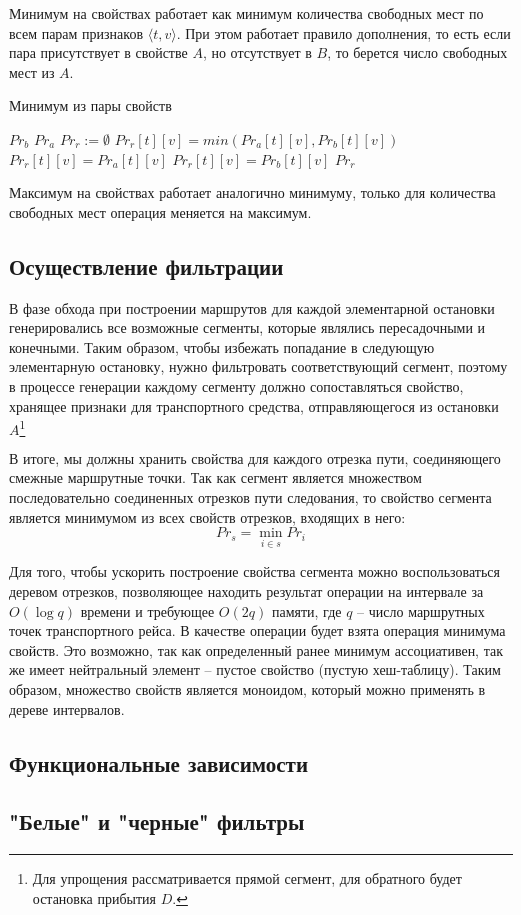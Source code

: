 Минимум на свойствах работает как минимум количества свободных мест по всем парам признаков $\langle t, v \rangle$. При этом работает правило дополнения, то есть если пара присутствует в свойстве $A$, но отсутствует в $B$, то берется число свободных мест из $A$.

\begin{algorithm}[!h]
	\caption{Минимум из пары свойств}\label{lst5}
	\begin{algorithmic}
			\State \Return $Pr_b$
		\EndIf
		\State \Return $Pr_a$
		\EndIf
		\State $Pr_r := \emptyset$ 
			\State $Pr_r[t][v] = min(Pr_a[t][v], Pr_b[t][v])$
		\EndFor
			\State $Pr_r[t][v] = Pr_a[t][v]$
		\EndFor
			\State $Pr_r[t][v] = Pr_b[t][v]$
		\EndFor
		\State \Return $Pr_r$
		\EndFunction
	\end{algorithmic}
\end{algorithm}

Максимум на свойствах работает аналогично минимуму, только для количества свободных мест операция меняется на максимум.

\subsection{Осуществление фильтрации}
В фазе обхода при построении маршрутов для каждой элементарной остановки генерировались все возможные сегменты, которые являлись пересадочными и конечными. Таким образом, чтобы избежать попадание в следующую элементарную остановку, нужно фильтровать соответствующий сегмент, поэтому в процессе генерации каждому сегменту должно сопоставляться свойство, хранящее признаки для транспортного средства, отправляющегося из остановки $A$\footnote{Для упрощения рассматривается прямой сегмент, для обратного будет остановка прибытия $D$.}

В итоге, мы должны хранить свойства для каждого отрезка пути, соединяющего смежные маршрутные точки. Так как сегмент является множеством последовательно соединенных отрезков пути следования, то свойство сегмента является минимумом из всех свойств отрезков, входящих в него:
\[
Pr_s=\min_{i \in s}{Pr_i}
\]

Для того, чтобы ускорить построение свойства сегмента можно воспользоваться деревом отрезков, позволяющее находить результат операции на интервале за $O(\log q)$ времени и требующее $O(2q)$ памяти, где $q$ -- число маршрутных точек транспортного рейса. В качестве операции будет взята операция минимума свойств. Это возможно, так как определенный ранее минимум ассоциативен, так же имеет нейтральный элемент -- пустое свойство (пустую хеш-таблицу). Таким образом, множество свойств является моноидом, который можно применять в дереве интервалов.

\subsection{Функциональные зависимости}

\subsection{"Белые" и "черные" фильтры}

\chapterconclusion